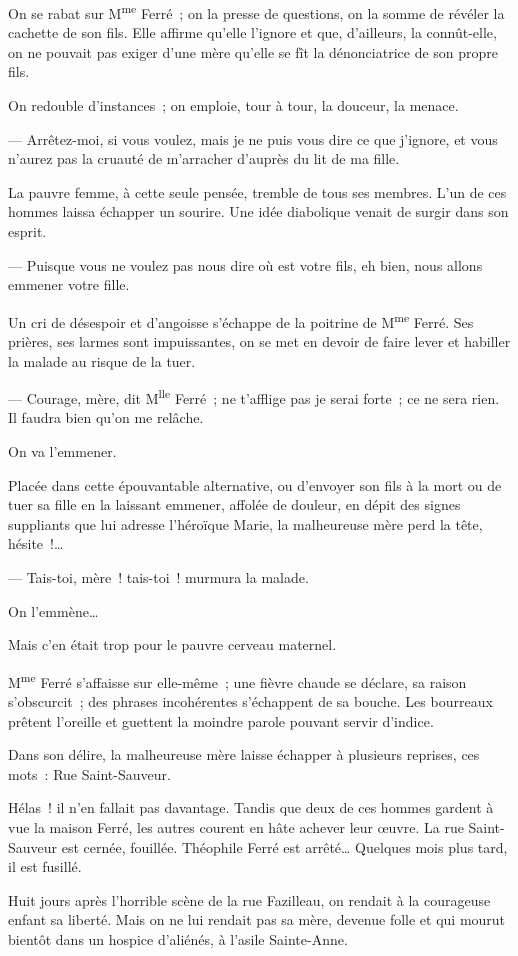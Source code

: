 \documentclass[french,twoside]{book} %
\newenvironment{quoteblock}%
  {\begin{quoting}}
  {\end{quoting}}
\newenvironment{quotebar}{%
    \def\FrameCommand{{\color{rubric!10!}\vrule width 0.5em} \hspace{0.9em}}%
    \def\OuterFrameSep{\itemsep} %
    \MakeFramed {\advance\hsize-\width \FrameRestore}
  }%
  {%
    \endMakeFramed
  }
\renewenvironment{quoteblock}%
  {%
    \savenotes
    \setstretch{0.9}
    \normalfont
    \begin{quotebar}
  }
  {%
    \end{quotebar}
    \spewnotes
  }
\begin{document}
\begin{quoteblock}
 On se rabat sur M\textsuperscript{me} Ferré ; on la presse de questions, on la somme de révéler la cachette de son fils. Elle affirme qu’elle l’ignore et que, d’ailleurs, la connût-elle, on ne pouvait pas exiger d’une mère qu’elle se fît la dénonciatrice de son propre fils.\par
 On redouble d’instances ; on emploie, tour à tour, la douceur, la menace.\par
 — Arrêtez-moi, si vous voulez, mais je ne puis vous dire ce que j’ignore, et vous n’aurez pas la cruauté de m’arracher d’auprès du lit de ma fille.\par
   La pauvre femme, à cette seule pensée, tremble de tous ses membres. L’un de ces hommes laissa échapper un sourire. Une idée diabolique venait de surgir dans son esprit.\par
 — Puisque vous ne voulez pas nous dire où est votre fils, eh bien, nous allons emmener votre fille.\par
 Un cri de désespoir et d’angoisse s’échappe de la poitrine de M\textsuperscript{me} Ferré. Ses prières, ses larmes sont impuissantes, on se met en devoir de faire lever et habiller la malade au risque de la tuer.\par
 — Courage, mère, dit M\textsuperscript{lle} Ferré ; ne t’afflige pas je serai forte ; ce ne sera rien. Il faudra bien qu’on me relâche.\par
 On va l’emmener.\par
 Placée dans cette épouvantable alternative, ou d’envoyer son fils à la mort ou de tuer sa fille en la laissant emmener, affolée de douleur, en dépit des signes suppliants que lui adresse l’héroïque Marie, la malheureuse mère perd la tête, hésite !…\par
 — Tais-toi, mère ! tais-toi ! murmura la malade.\par
 On l’emmène…\par
 Mais c’en était trop pour le pauvre cerveau maternel.\par
 M\textsuperscript{me} Ferré s’affaisse sur elle-même ; une fièvre chaude se déclare, sa raison s’obscurcit ; des phrases incohérentes s’échappent de sa bouche. Les bourreaux prêtent l’oreille et guettent la moindre parole pouvant servir d’indice.\par
 Dans son délire, la malheureuse mère laisse échapper à plusieurs reprises, ces mots : Rue Saint-Sauveur.\par
 Hélas ! il n’en fallait pas davantage. Tandis que deux de ces hommes gardent à vue la maison Ferré, les autres courent en hâte achever leur œuvre. La rue Saint-Sauveur est cernée, fouillée. Théophile Ferré est arrêté… Quelques mois plus tard, il est fusillé.\par
 Huit jours après l’horrible scène de la rue Fazilleau,  on rendait à la courageuse enfant sa liberté. Mais on ne lui rendait pas sa mère, devenue folle et qui mourut bientôt dans un hospice d’aliénés, à l’asile Sainte-Anne.
 \end{quoteblock}
\end{document}
